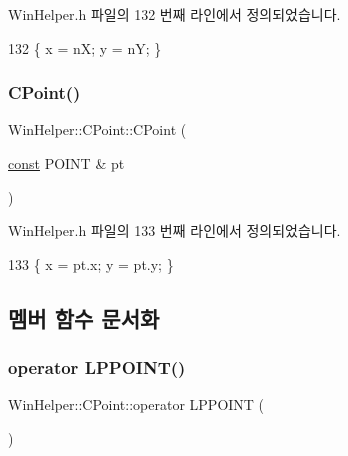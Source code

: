 Win\+Helper.\+h 파일의 132 번째 라인에서 정의되었습니다.


\begin{DoxyCode}
132 \{ x = nX; y = nY; \}
\end{DoxyCode}
\mbox{\label{class_win_helper_1_1_c_point_a24a90efac3a1cb2e699ea7cfa6f85bf6}} 
\subsubsection{\texorpdfstring{C\+Point()}{CPoint()}\hspace{0.1cm}{\footnotesize\ttfamily [4/4]}}
{\footnotesize\ttfamily Win\+Helper\+::\+C\+Point\+::\+C\+Point (\begin{DoxyParamCaption}\item[{\mbox{\hyperlink{getopt1_8c_a2c212835823e3c54a8ab6d95c652660e}{const}} P\+O\+I\+NT \&}]{pt }\end{DoxyParamCaption})\hspace{0.3cm}{\ttfamily [inline]}}



Win\+Helper.\+h 파일의 133 번째 라인에서 정의되었습니다.


\begin{DoxyCode}
133 \{ x = pt.x; y = pt.y; \}
\end{DoxyCode}


\subsection{멤버 함수 문서화}
\mbox{\label{class_win_helper_1_1_c_point_a3aa8bdc5ec8ff66c3492bc39c2a3e6a1}} 
\subsubsection{\texorpdfstring{operator L\+P\+P\+O\+I\+N\+T()}{operator LPPOINT()}}
{\footnotesize\ttfamily Win\+Helper\+::\+C\+Point\+::operator L\+P\+P\+O\+I\+NT (\begin{DoxyParamCaption}{ }\end{DoxyParamCaption})\hspace{0.3cm}{\ttfamily [inline]}}



